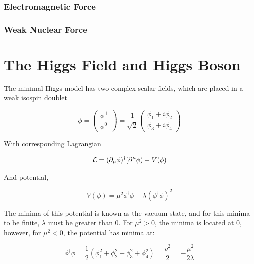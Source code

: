 \subsubsection{Electromagnetic Force}
\subsubsection{Weak Nuclear Force}


\section{The Higgs Field and Higgs Boson}

The minimal Higgs model has two complex scalar fields, which are placed in a weak isospin doublet

\begin{equation}
\phi = \begin{pmatrix} \phi^+ \\ \phi^0 \end{pmatrix}
    = \frac{1}{\sqrt{2}}\begin{pmatrix}
        \phi_1 + i\phi_2 \\ \phi_3 + i\phi_4
    \end{pmatrix}
\end{equation}

With corresponding Lagrangian

\begin{equation} \label{higgs-lagrangian}
    \mathcal{L} = (\partial_{\mu}\phi)^\dagger (\partial^{\mu}\phi) - V(\phi)\\
\end{equation}

And potential,

\begin{equation} \label{higgs-potential}
    V(\phi) = \mu^2\phi^\dagger \phi - \lambda(\phi^\dagger \phi)^2
\end{equation}

The minima of this potential is known as the vacuum state, and for this minima to be finite, $\lambda$ must be greater than 0. For $\mu^2 >0$, the minima is located at 0, however, for $\mu^2<0$, the potential has minima at:

\begin{equation}
    \phi^\dagger \phi = \frac{1}{2}(\phi_{1}^{2}+\phi_{2}^{2}+\phi_{3}^{2}+\phi_{4}^{2}) = \frac{v^2}{2} = -\frac{\mu^2}{2\lambda}
\end{equation}

